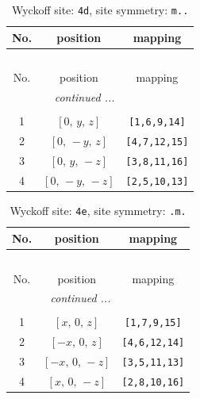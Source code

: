 \documentclass[fleqn,8pt]{jsarticle}
\begin{document}
\begin{longtable}{ccc}
\caption{Wyckoff site: {\tt 4d}, site symmetry: {\tt m..}}
 \\
 \hline \hline
No. & position & mapping \\ \hline \endfirsthead

\multicolumn{2}{l}{\tablename\ \thetable{}} \\
 \hline \hline
No. & position & mapping \\ \hline \endhead

 \hline \hline
\multicolumn{2}{r}{\footnotesize\it continued ...} \\ \endfoot

 \hline \hline
\multicolumn{2}{r}{} \\ \endlastfoot

1 & $\left[ 0,\, y,\, z \right]$ & {\tt [1,6,9,14]} \\ \hline
2 & $\left[ 0,\, - y,\, z \right]$ & {\tt [4,7,12,15]} \\ \hline
3 & $\left[ 0,\, y,\, - z \right]$ & {\tt [3,8,11,16]} \\ \hline
4 & $\left[ 0,\, - y,\, - z \right]$ & {\tt [2,5,10,13]} \\
\end{longtable}
\renewcommand{\arraystretch}{1.2}
\begin{longtable}{ccc}
\caption{Wyckoff site: {\tt 4e}, site symmetry: {\tt .m.}}
 \\
 \hline \hline
No. & position & mapping \\ \hline \endfirsthead

\multicolumn{2}{l}{\tablename\ \thetable{}} \\
 \hline \hline
No. & position & mapping \\ \hline \endhead

 \hline \hline
\multicolumn{2}{r}{\footnotesize\it continued ...} \\ \endfoot

 \hline \hline
\multicolumn{2}{r}{} \\ \endlastfoot

1 & $\left[ x,\, 0,\, z \right]$ & {\tt [1,7,9,15]} \\ \hline
2 & $\left[ - x,\, 0,\, z \right]$ & {\tt [4,6,12,14]} \\ \hline
3 & $\left[ - x,\, 0,\, - z \right]$ & {\tt [3,5,11,13]} \\ \hline
4 & $\left[ x,\, 0,\, - z \right]$ & {\tt [2,8,10,16]} \\
\end{longtable}
\end{document}
